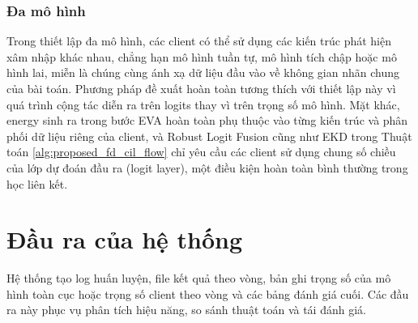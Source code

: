 \subsubsection{Đa mô hình}

Trong thiết lập đa mô hình, các client có thể sử dụng các kiến trúc phát hiện xâm nhập khác nhau, chẳng hạn mô hình tuần tự, mô hình tích chập hoặc mô hình lai, miễn là chúng cùng ánh xạ dữ liệu đầu vào về không gian nhãn chung của bài toán. Phương pháp đề xuất hoàn toàn tương thích với thiết lập này vì quá trình cộng tác diễn ra trên logits thay vì trên trọng số mô hình. Mặt khác, energy sinh ra trong bước EVA hoàn toàn phụ thuộc vào từng kiến trúc và phân phối dữ liệu riêng của client, và Robust Logit Fusion cũng như EKD trong Thuật toán \ref{alg:proposed_fd_cil_flow} chỉ yêu cầu các client sử dụng chung số chiều của lớp dự đoán đầu ra (logit layer), một điều kiện hoàn toàn bình thường trong học liên kết.

\section{Đầu ra của hệ thống}

Hệ thống tạo log huấn luyện, file kết quả theo vòng, bản ghi trọng số của mô hình toàn cục hoặc trọng số client theo vòng và các bảng đánh giá cuối. Các đầu ra này phục vụ phân tích hiệu năng, so sánh thuật toán và tái đánh giá.
